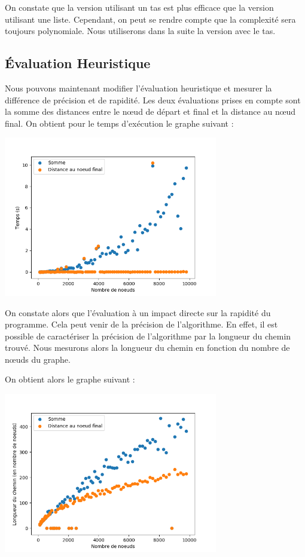 On constate que la version utilisant un tas est plus efficace que la version utilisant une liste. 
Cependant, on peut se rendre compte que la complexité sera toujours polynomiale.
Nous utiliserons dans la suite la version avec le tas.

\subsection{Évaluation Heuristique}

Nous pouvons maintenant modifier l’évaluation heuristique et mesurer la différence de précision et de rapidité. 
Les deux évaluations prises en compte sont la somme des distances entre le nœud de départ et final et la distance 
au nœud final. 
On obtient pour le temps d’exécution le graphe suivant :

\begin{center}
    \includegraphics[height=7cm]{2.png}
\end{center}

On constate alors que l’évaluation à un impact directe sur la rapidité du programme. Cela peut venir de 
la précision de l’algorithme. En effet, il est possible de caractériser la précision de l’algorithme par la longueur 
du chemin trouvé. 
Nous mesurons alors la longueur du chemin en fonction du nombre de nœuds du graphe. 

On obtient alors le graphe suivant :

\begin{center}
    \includegraphics[height=7cm]{3.png}
\end{center}

